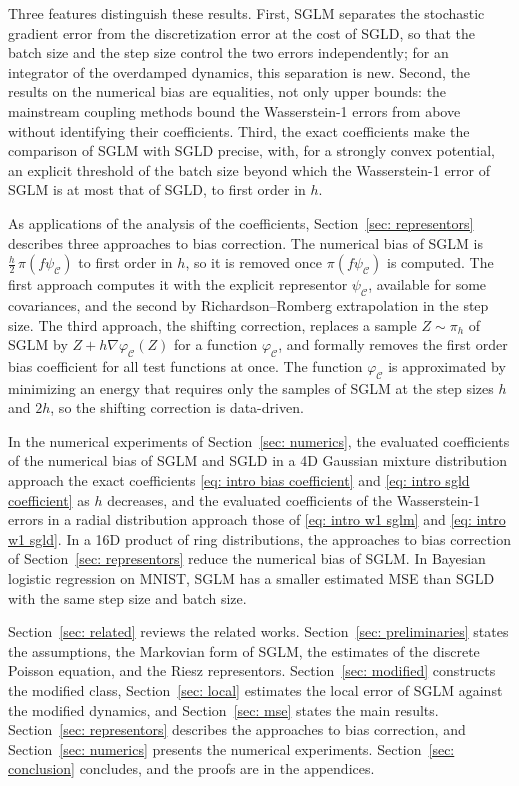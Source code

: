\documentclass{article}
\numberwithin{equation}{section}
\begin{document}
Three features distinguish these results. First, SGLM separates the stochastic gradient error from the discretization error at the cost of SGLD, so that the batch size and the step size control the two errors independently; for an integrator of the overdamped dynamics, this separation is new. Second, the results on the numerical bias are equalities, not only upper bounds: the mainstream coupling methods bound the Wasserstein-1 errors from above without identifying their coefficients. Third, the exact coefficients make the comparison of SGLM with SGLD precise, with, for a strongly convex potential, an explicit threshold of the batch size beyond which the Wasserstein-1 error of SGLM is at most that of SGLD, to first order in $h$.

As applications of the analysis of the coefficients, Section~\ref{sec: representors} describes three approaches to bias correction. The numerical bias of SGLM is $\frac h2\, \pi(f \psi_{\mathcal C})$ to first order in $h$, so it is removed once $\pi(f \psi_{\mathcal C})$ is computed. The first approach computes it with the explicit representor $\psi_{\mathcal C}$, available for some covariances, and the second by Richardson--Romberg extrapolation in the step size. The third approach, the shifting correction, replaces a sample $Z \sim \pi_h$ of SGLM by $Z + h \nabla \varphi_{\mathcal C}(Z)$ for a function $\varphi_{\mathcal C}$, and formally removes the first order bias coefficient for all test functions at once. The function $\varphi_{\mathcal C}$ is approximated by minimizing an energy that requires only the samples of SGLM at the step sizes $h$ and $2h$, so the shifting correction is data-driven.

In the numerical experiments of Section~\ref{sec: numerics}, the evaluated coefficients of the numerical bias of SGLM and SGLD in a 4D Gaussian mixture distribution approach the exact coefficients \eqref{eq: intro bias coefficient} and \eqref{eq: intro sgld coefficient} as $h$ decreases, and the evaluated coefficients of the Wasserstein-1 errors in a radial distribution approach those of \eqref{eq: intro w1 sglm} and \eqref{eq: intro w1 sgld}. In a 16D product of ring distributions, the approaches to bias correction of Section~\ref{sec: representors} reduce the numerical bias of SGLM. In Bayesian logistic regression on MNIST, SGLM has a smaller estimated MSE than SGLD with the same step size and batch size.

Section~\ref{sec: related} reviews the related works. Section~\ref{sec: preliminaries} states the assumptions, the Markovian form of SGLM, the estimates of the discrete Poisson equation, and the Riesz representors. Section~\ref{sec: modified} constructs the modified class, Section~\ref{sec: local} estimates the local error of SGLM against the modified dynamics, and Section~\ref{sec: mse} states the main results. Section~\ref{sec: representors} describes the approaches to bias correction, and Section~\ref{sec: numerics} presents the numerical experiments. Section~\ref{sec: conclusion} concludes, and the proofs are in the appendices.
\end{document}

